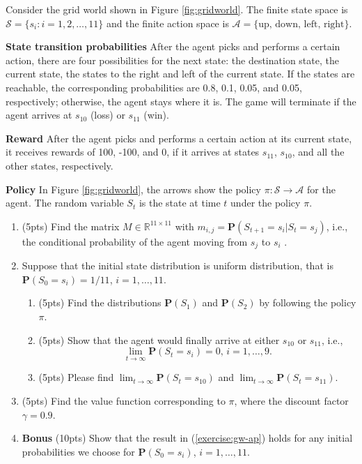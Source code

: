 \documentclass[11pt,letter,notitlepage]{article}
\begin{document}
\newpage
\begin{exercise}\label{exercise:GridWorld}

	Consider the grid world shown in Figure \ref{fig:gridworld}. The finite state space is $\mathcal{S} = \{s_i:i=1,2,\dots, 11\}$ and the finite action space is $\mathcal{A} = \{\mbox{up, down, left, right}\}$.

	\noindent\textbf{State transition probabilities} After the agent picks and performs a certain action, there are four
	possibilities for the next state: the destination state, the current state, the states to the right and left of the current state. If the states are reachable, the corresponding probabilities are 0.8, 0.1, 0.05, and 0.05, respectively; otherwise, the agent stays where it is. The game will terminate if the agent arrives at $s_{10}$ (loss) or $s_{11}$ (win).

	\noindent\textbf{Reward} After the agent picks and performs a certain action at its current state, it receives rewards of 100, -100, and 0, if it arrives at states $s_{11}$, $s_{10}$, and all the other states, respectively.

	\noindent\textbf{Policy} In Figure \ref{fig:gridworld}, the arrows show the policy $\pi:\mathcal{S}\rightarrow\mathcal{A}$ for the agent. The random variable $S_t$ is the state at time $t$ under the policy $\pi$.

	\begin{enumerate}
		\item (5pts) Find the matrix $M\in\mathbb{R}^{11\times 11}$ with $m_{i,j}=\mathbf{P}(S_{t+1}=s_i|S_t=s_j)$, i.e., the conditional probability of the agent moving from $s_j$ to $s_i$ .

		\item Suppose that the initial state distribution is uniform distribution, that is $\mathbf{P}(S_0=s_i)=1/11$, $i=1,\ldots,11$.
		      \begin{enumerate}
			      \item (5pts) Find the distributions $\mathbf{P}(S_1)$ and $\mathbf{P}(S_2)$ by following the policy $\pi$.
			      \item\label{exercise:gw-ap} (5pts) Show that the agent would finally arrive at either $s_{10}$ or $s_{11}$, i.e., $$\lim_{t\rightarrow\infty}\mathbf{P}(S_t=s_i)=0,\,i=1,\ldots,9.$$
			      \item (5pts) Please find $\lim_{t\rightarrow\infty}\mathbf{P}(S_t=s_{10})$ and $\lim_{t\rightarrow\infty}\mathbf{P}(S_t=s_{11})$.
		      \end{enumerate}

		\item (5pts) Find the value function corresponding to $\pi$, where the discount factor $\gamma=0.9$.

		\item \textbf{Bonus} (10pts) Show that the result in (\ref{exercise:gw-ap}) holds for any initial probabilities we choose for $\mathbf{P}(S_0=s_i)$, $i=1,\ldots,11$.
	\end{enumerate}

\end{exercise}
\end{document}
